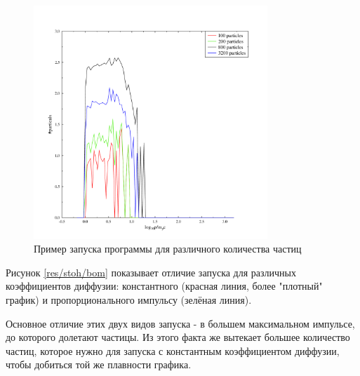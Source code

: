 \documentclass[a4paper,14pt]{extarticle} %
\begin{document}
\begin{figure}[!htb]
\centering
\includegraphics[width=250pt]{stoh_particles}
\caption{Пример запуска программы для различного количества частиц}
\label{res/stoh/particles}
\end{figure}
Рисунок \ref{res/stoh/bom} показывает отличие запуска для различных коэффициентов диффузии: константного (красная линия, более "плотный" график) и пропорционального импульсу (зелёная линия). 

Основное отличие этих двух видов запуска - в большем максимальном импульсе, до которого долетают частицы. Из этого факта же вытекает большее количество частиц, которое нужно для запуска с константным коэффициентом диффузии, чтобы добиться той же плавности графика.
\end{document}
